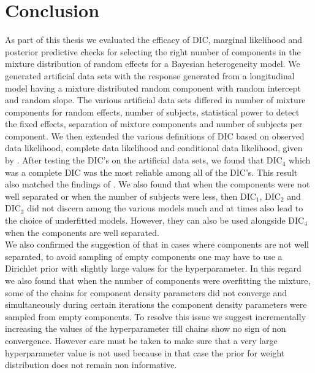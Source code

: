 
\chapter{Conclusion}
\label{ch : conclusion}

As part of this thesis we evaluated the efficacy of DIC, marginal likelihood and posterior predictive checks for selecting the right number of components in the mixture distribution of random effects for a Bayesian heterogeneity model. We generated artificial data sets with the response generated from a longitudinal model having a mixture distributed random component with random intercept and random slope. The various artificial data sets differed in number of mixture components for random effects, number of subjects, statistical power to detect the fixed effects, separation of mixture components and number of subjects per component. We then extended the various definitions of DIC based on observed data likelihood, complete data likelihood and conditional data likelihood, given by \citet{celeux_deviance_2006}. After testing the DIC's on the artificial data sets, we found that $\text{DIC}_4$ which was a complete DIC was the most reliable among all of the DIC's. This result also matched the findings of \citet{celeux_deviance_2006}. We also found that when the components were not well separated or when the number of subjects were less, then $\text{DIC}_1$, $\text{DIC}_2$ and $\text{DIC}_3$ did not discern among the various models much and at times also lead to the choice of underfitted models. However, they can also be used alongside $\text{DIC}_4$ when the components are well separated.\\

We also confirmed the suggestion of \citet{fruhwirth-schnatter_finite_2013} that in cases where components are not well separated, to avoid sampling of empty components one may have to use a Dirichlet prior with slightly large values for the hyperparameter. In this regard we also found that when the number of components were overfitting the mixture, some of the chains for component density parameters did not converge and simultaneously during certain iterations the component density parameters were sampled from empty components. To resolve this issue we suggest incrementally increasing the values of the hyperparameter till chains show no sign of non convergence. However care must be taken to make sure that a very large hyperparameter value is not used because in that case the prior for weight distribution does not remain non informative.\\

